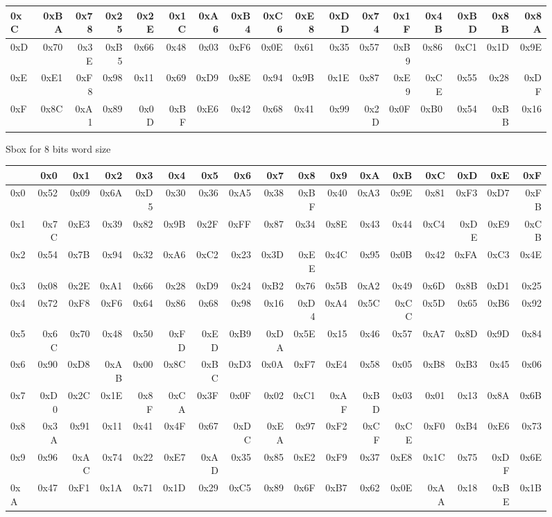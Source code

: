 \documentclass[10pt,a4paper,twoside]{llncs}
\begin{document}
\begin{figure}[ht]
{\begin{center}
\begin{tabular}[]{|l||r|r|r|r|r|r|r|r|r|r|r|r|r|r|r|r|}
0xC & 0xBA&0x78&0x25&0x2E&0x1C&0xA6&0xB4&0xC6&0xE8&0xDD&0x74&0x1F&0x4B&0xBD&0x8B&0x8A \\\hline
0xD & 0x70&0x3E&0xB5&0x66&0x48&0x03&0xF6&0x0E&0x61&0x35&0x57&0xB9&0x86&0xC1&0x1D&0x9E \\\hline
0xE & 0xE1&0xF8&0x98&0x11&0x69&0xD9&0x8E&0x94&0x9B&0x1E&0x87&0xE9&0xCE&0x55&0x28&0xDF \\\hline
0xF & 0x8C&0xA1&0x89&0x0D&0xBF&0xE6&0x42&0x68&0x41&0x99&0x2D&0x0F&0xB0&0x54&0xBB&0x16 \\\hline
\end{tabular}
\end{center}}
\caption{Sbox for 8 bits word size}
\label{tab:sbox8}
\end{figure}

\begin{figure}[ht]{\tiny
\begin{center}
\begin{tabular}[]{|l||r|r|r|r|r|r|r|r|r|r|r|r|r|r|r|r|}\hline
    & 0x0& 0x1& 0x2& 0x3& 0x4& 0x5& 0x6& 0x7& 0x8& 0x9& 0xA& 0xB& 0xC& 0xD& 0xE& 0xF\\\hline\hline
0x0 &0x52&0x09&0x6A&0xD5&0x30&0x36&0xA5&0x38&0xBF&0x40&0xA3&0x9E&0x81&0xF3&0xD7&0xFB\\\hline
0x1 &0x7C&0xE3&0x39&0x82&0x9B&0x2F&0xFF&0x87&0x34&0x8E&0x43&0x44&0xC4&0xDE&0xE9&0xCB\\\hline
0x2 &0x54&0x7B&0x94&0x32&0xA6&0xC2&0x23&0x3D&0xEE&0x4C&0x95&0x0B&0x42&0xFA&0xC3&0x4E\\\hline
0x3 &0x08&0x2E&0xA1&0x66&0x28&0xD9&0x24&0xB2&0x76&0x5B&0xA2&0x49&0x6D&0x8B&0xD1&0x25\\\hline
0x4 &0x72&0xF8&0xF6&0x64&0x86&0x68&0x98&0x16&0xD4&0xA4&0x5C&0xCC&0x5D&0x65&0xB6&0x92\\\hline
0x5 &0x6C&0x70&0x48&0x50&0xFD&0xED&0xB9&0xDA&0x5E&0x15&0x46&0x57&0xA7&0x8D&0x9D&0x84\\\hline
0x6 &0x90&0xD8&0xAB&0x00&0x8C&0xBC&0xD3&0x0A&0xF7&0xE4&0x58&0x05&0xB8&0xB3&0x45&0x06\\\hline
0x7 &0xD0&0x2C&0x1E&0x8F&0xCA&0x3F&0x0F&0x02&0xC1&0xAF&0xBD&0x03&0x01&0x13&0x8A&0x6B\\\hline
0x8 &0x3A&0x91&0x11&0x41&0x4F&0x67&0xDC&0xEA&0x97&0xF2&0xCF&0xCE&0xF0&0xB4&0xE6&0x73\\\hline
0x9 &0x96&0xAC&0x74&0x22&0xE7&0xAD&0x35&0x85&0xE2&0xF9&0x37&0xE8&0x1C&0x75&0xDF&0x6E\\\hline
0xA &0x47&0xF1&0x1A&0x71&0x1D&0x29&0xC5&0x89&0x6F&0xB7&0x62&0x0E&0xAA&0x18&0xBE&0x1B\\\hline

\end{tabular}
\end{center}}
\end{figure}
\end{document}
